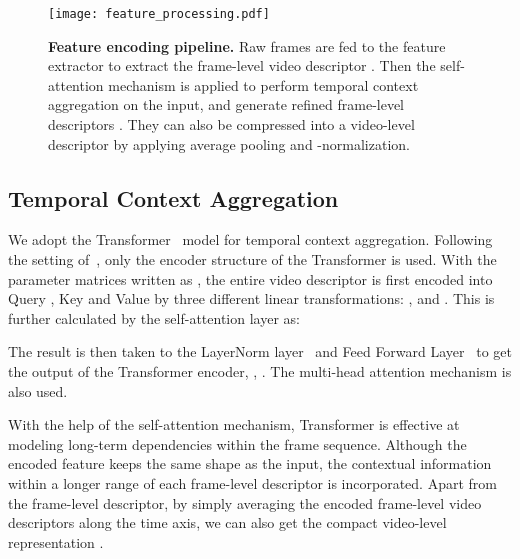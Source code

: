 \documentclass[10pt,twocolumn,letterpaper]{article}
\begin{document}
\begin{figure}[t]
    \centering
    \texttt{[image: feature\_processing.pdf]}
    \caption{\textbf{Feature encoding pipeline.} Raw frames are fed to the feature extractor to extract the frame-level video descriptor . Then the self-attention mechanism is applied to perform temporal context aggregation on the input, and generate refined frame-level descriptors  . They can also be compressed into a video-level descriptor by applying average pooling and -normalization.}
\label{fig:feature}
\end{figure}

\subsection{Temporal Context Aggregation} \label{subsection:featagg}
We adopt the Transformer~\cite{vaswani2017attention} model for temporal context aggregation. Following the setting of~\cite{feng2018video,Xia2019WeaklySE}, only the encoder structure of the Transformer is used. With the parameter matrices written as , the entire video descriptor  is first encoded into Query , Key  and Value  by three different linear transformations: ,  and . This is further calculated by the self-attention layer as:
{\small

}
The result is then taken to the LayerNorm layer~\cite{ba2016layer} and Feed Forward Layer~\cite{vaswani2017attention} to get the output of the Transformer encoder, \ie, . The multi-head attention mechanism is also used. 

With the help of the self-attention mechanism, Transformer is effective at modeling long-term dependencies within the frame sequence. Although the encoded feature keeps the same shape as the input, the contextual information within a longer range of each frame-level descriptor is incorporated. Apart from the frame-level descriptor, by simply averaging the encoded frame-level video descriptors along the time axis, we can also get the compact video-level representation . 
\end{document}
